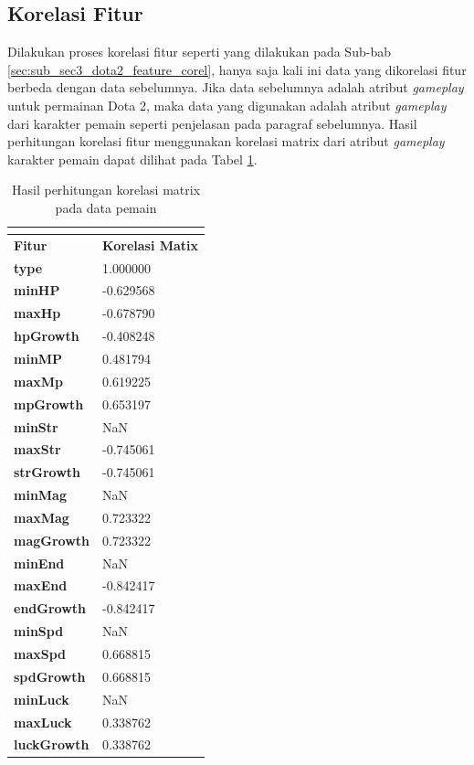 \subsection{Korelasi Fitur}
\label{sec:sub_sec3_player_feature_corel}
\vspace{1ex}

Dilakukan proses korelasi fitur seperti yang dilakukan pada Sub-bab \ref{sec:sub_sec3_dota2_feature_corel}, hanya saja kali ini data yang dikorelasi fitur berbeda dengan data sebelumnya. Jika data sebelumnya adalah atribut \textit{gameplay} untuk permainan Dota 2, maka data yang digunakan adalah atribut \textit{gameplay} dari karakter pemain seperti penjelasan pada paragraf sebelumnya. Hasil perhitungan korelasi fitur menggunakan korelasi matrix dari atribut \textit{gameplay} karakter pemain dapat dilihat pada Tabel \ref{tb:player_matrix_corel}. 
\vspace{-1ex}

\begin{longtable}{|l|l|}
	\caption{Hasil perhitungan korelasi matrix pada data pemain}
	\vspace{1ex}
	\label{tb:player_matrix_corel}\\
	\hline
	\rowcolor[HTML]{C0C0C0}
	\textbf{Fitur} & \textbf{Korelasi Matix} \\ \hline
	\textbf{type} & 1.000000 \\ \hline
	\textbf{minHP} & -0.629568 \\ \hline
	\textbf{maxHp} & -0.678790 \\ \hline
	\textbf{hpGrowth} & -0.408248 \\ \hline
	\textbf{minMP} & 0.481794 \\ \hline
	\textbf{maxMp} & 0.619225 \\ \hline
	\textbf{mpGrowth} & 0.653197 \\ \hline
	\textbf{minStr} & NaN \\ \hline
	\textbf{maxStr} & -0.745061 \\ \hline
	\textbf{strGrowth} & -0.745061 \\ \hline
	\textbf{minMag} & NaN \\ \hline
	\textbf{maxMag} & 0.723322 \\ \hline
	\textbf{magGrowth} & 0.723322 \\ \hline
	\textbf{minEnd} & NaN \\ \hline
	\textbf{maxEnd} & -0.842417 \\ \hline
	\textbf{endGrowth} & -0.842417 \\ \hline
	\textbf{minSpd} & NaN \\ \hline
	\textbf{maxSpd} & 0.668815 \\ \hline
	\textbf{spdGrowth} & 0.668815 \\ \hline
	\textbf{minLuck} & NaN \\ \hline
	\textbf{maxLuck} & 0.338762 \\ \hline
	\textbf{luckGrowth} & 0.338762 \\ \hline
\end{longtable}
\vspace{1ex}

